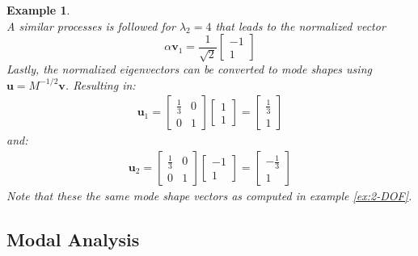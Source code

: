 \documentclass[12pt,letter]{article}
\newtheorem{ex}{Example}
\numberwithin{ex}{section} %
\newenvironment{example}{\begin{mdframed}[middlelinewidth=0.5mm]\begin{ex}\normalfont}{\end{ex}\end{mdframed}}
\numberwithin{re}{section} %
\begin{document}
\begin{example}
\begin{equation}
\end{equation} 
A similar processes is followed for $\lambda_2=4$ that leads to the normalized vector 
\begin{equation}
\alpha \textbf{v}_1=  \frac{1}{\sqrt{2}} \begin{bmatrix} -1 \\ 1 \end{bmatrix} 
\end{equation} 
Lastly, the normalized eigenvectors can be converted to mode shapes using $\textbf{u} = M^{-1/2}\textbf{v}$. Resulting in: 
\begin{eqnarray}
\textbf{u}_1 =  \begin{bmatrix} \frac{1}{3} & 0  \\  0 & 1 \end{bmatrix}   \begin{bmatrix} 1 \\  1 \end{bmatrix} =  \begin{bmatrix} \frac{1}{3} \\  1 \end{bmatrix}
\end{eqnarray}
and:
\begin{eqnarray}
\textbf{u}_2 =  \begin{bmatrix} \frac{1}{3} & 0  \\  0 & 1 \end{bmatrix}   \begin{bmatrix} -1 \\  1 \end{bmatrix} =  \begin{bmatrix} -\frac{1}{3} \\  1 \end{bmatrix}
\end{eqnarray}
Note that these the same mode shape vectors as computed in example \ref{ex:2-DOF}.
\end{example}

\subsection{Modal Analysis}
\end{document}
